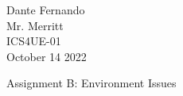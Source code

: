 \documentclass[12pt]{article}
\newcommand{\bibent}{\noindent \hangindent 40pt}
\newenvironment{workscited}{\newpage \begin{center} Works Cited \end{center}}{\newpage }
\begin{document}
\begin{flushleft}

Dante Fernando\\
Mr. Merritt\\
ICS4UE-01\\
October 14 2022\\


\begin{center}
Assignment B: Environment Issues
\end{center}


\setlength{\parindent}{0.5in}


\newpage
















\printbibliography[heading=bibintoc]


\end{flushleft}
\end{document}
